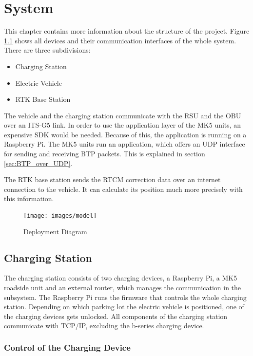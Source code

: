 \chapter{System}\label{ch:system}

This chapter contains more information about the structure of the project. Figure \ref{fig:Deployment_Model} shows all devices and their communication interfaces of the whole system. There are three subdivisions:

\begin{itemize}
	\item Charging Station
	\item Electric Vehicle
	\item RTK Base Station
\end{itemize}

The vehicle and the charging station communicate with the RSU and the OBU over an ITS-G5 link. In order to use the application layer of the MK5 units, an expensive SDK would be needed. Because of this, the application is running on a Raspberry Pi. The MK5 units run an application, which offers an UDP interface for sending and receiving BTP packets. This is explained in section \ref{sec:BTP_over_UDP}.

The RTK base station sends the RTCM correction data over an internet connection to the vehicle. It can calculate its position much more precisely with this information.

\begin{figure}[htb]
	\centering
	\texttt{[image: images/model]}
	\caption{Deployment Diagram}
	\label{fig:Deployment_Model}
\end{figure}

\clearpage
\pagebreak


\section{Charging Station}

The charging station consists of two charging devices, a Raspberry Pi, a MK5 roadside unit and an external router, which manages the communication in the subsystem. The Raspberry Pi runs the firmware that controls the whole charging station. Depending on which parking lot the electric vehicle is positioned, one of the charging devices gets unlocked. All components of the charging station communicate with TCP/IP, excluding the b-series charging device.

\subsection{Control of the Charging Device}

